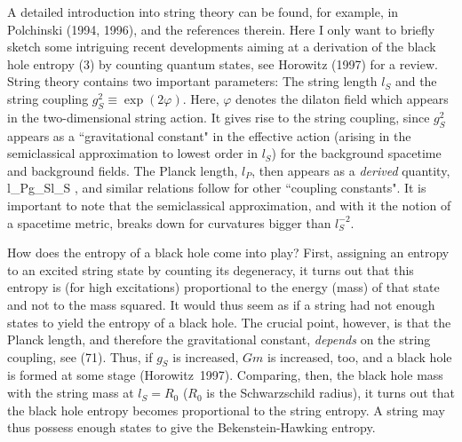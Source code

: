 A detailed introduction into string theory can be found,
for example, in Polchinski (1994, 1996), and the references
therein. Here I only want to briefly sketch some intriguing recent
developments aiming at a derivation of the black hole entropy (3)
by counting quantum states, see Horowitz (1997) for a review.
String theory contains two important parameters: The string
length $l_S$ and the string coupling $g_S^2\equiv\exp(2\varphi)$.
Here, $\varphi$ denotes the dilaton field which appears in the
two-dimensional string action. It gives rise to the string coupling,
since $g_S^2$ appears as a ``gravitational constant"
 in the effective action (arising in the
semiclassical approximation to lowest order in $l_S$) for
the background spacetime and background fields. 
The Planck length, $l_P$, then appears as a {\em derived}
quantity,
 \be l_P\propto g_Sl_S \enspace , \ee
 and similar relations
follow for other ``coupling constants". 
It is important to note that the semiclassical approximation,
and with it the notion of a spacetime metric, breaks down
for curvatures bigger than $l_S^{-2}$.

How does the entropy of a black hole come into play?
First, assigning an entropy to an excited string state by counting
its degeneracy, it turns out that this entropy is (for high
excitations) proportional to the energy (mass) of that state and
not to the mass squared. It would thus seem as if a string had not
enough states to yield the entropy of a black hole.
The crucial point, however, is that the Planck length, and
therefore the gravitational constant, {\em depends} on the string coupling,
see (71). Thus, if $g_S$ is increased, $Gm$ is increased, too,
and a black hole is formed at some stage (Horowitz~1997).
Comparing, then, the black hole mass with the string mass
at $l_S=R_0$ ($R_0$ is the Schwarzschild radius), it turns out
that the black hole entropy becomes proportional to the string entropy.
A string may thus possess enough states to give the
Bekenstein-Hawking entropy.

